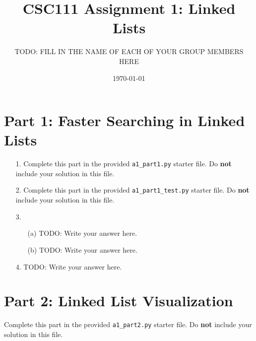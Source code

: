 \documentclass[fontsize=11pt]{article}
\title{CSC111 Assignment 1: Linked Lists}
\author{TODO: FILL IN THE NAME OF EACH OF YOUR GROUP MEMBERS HERE}
\date{\today}
\begin{document}
\maketitle

\section*{Part 1: Faster Searching in Linked Lists}

\begin{enumerate}

\item[1.]
Complete this part in the provided \texttt{a1\_part1.py} starter file.
Do \textbf{not} include your solution in this file.

\item[2.]
Complete this part in the provided \texttt{a1\_part1\_test.py} starter file.
Do \textbf{not} include your solution in this file.

\item[3.]
\begin{enumerate}

    \item[(a)]
    TODO: Write your answer here.

    \item[(b)]
    TODO: Write your answer here.
\end{enumerate}

\item[4.]
TODO: Write your answer here.

\end{enumerate}

\section*{Part 2: Linked List Visualization}
Complete this part in the provided \texttt{a1\_part2.py} starter file.
Do \textbf{not} include your solution in this file.
\end{document}
